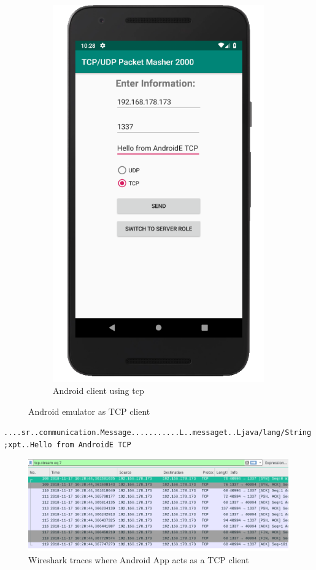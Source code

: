 \begin{figure}[H]
\begin{subfigure}{.49\textwidth}
		\includegraphics[width=0.74\linewidth]{images/task3/subtask1/androidclienttcp.png}
		\caption{Android client using tcp}
	\end{subfigure}%
	\caption{Android emulator as TCP client}
\end{figure}

\texttt{....sr..communication.Message...........L..messaget..Ljava/lang/String;xpt..Hello from AndroidE TCP} 

\begin{figure}[H]
	\includegraphics[width=1\linewidth]{images/task3/subtask1/wiresharkTCP.png}
	\caption{Wireshark traces where Android App acts as a TCP client}
\end{figure}

